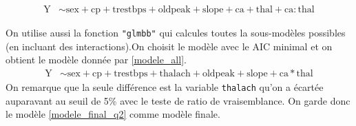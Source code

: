 \documentclass{article}
\begin{document}
	\begin{align}\label{modele_final_q2}
	\mathrm{Y} &\sim \mathrm{sex + cp + trestbps + oldpeak + slope + ca + 
		thal + ca:thal}
	\end{align}	
	
	On utilise aussi la fonction \texttt{"glmbb"} qui calcules toutes la sous-modèles possibles (en incluant des interactions).On choisit le modèle avec le AIC minimal et on obtient le modèle donnée par \eqref{modele_all}.
	\begin{align}\label{modele_all}
	\mathrm{Y} &\sim \mathrm{sex + cp + trestbps + thalach + oldpeak + slope + ca*thal}
	\end{align}
	On remarque que la seule différence est la variable \texttt{thalach} qu'on a écartée auparavant au seuil de 5\% avec le teste de ratio de vraisemblance. On garde donc le modèle \eqref{modele_final_q2} comme modèle finale. 
	
\end{document}
